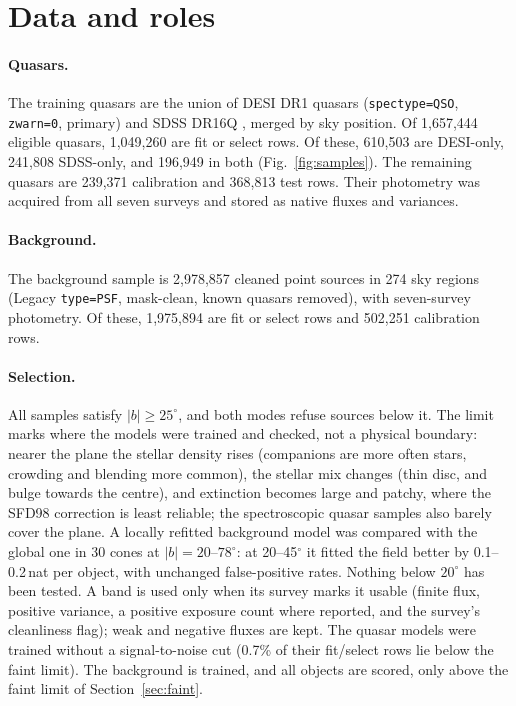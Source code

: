 \documentclass[11pt,a4paper]{article}
\newcommand{\code}[1]{\texttt{#1}}
\begin{document}
\section{Data and roles}\label{sec:data}
\paragraph{Quasars.} The training quasars are the union of DESI DR1 quasars (\code{spectype=QSO},
\code{zwarn=0}, primary) and SDSS DR16Q \citep{Lyke2020}, merged by sky position. Of 1,657,444
eligible quasars, 1,049,260 are fit or select rows. Of these, 610,503 are DESI-only, 241,808
SDSS-only, and 196,949 in both (Fig.~\ref{fig:samples}). The remaining quasars are 239,371
calibration and 368,813 test rows. Their photometry was acquired from all seven surveys and stored
as native fluxes and variances.

\paragraph{Background.} The background sample is 2,978,857 cleaned point sources in 274 sky regions
(Legacy \code{type=PSF}, mask-clean, known quasars removed), with seven-survey photometry. Of these,
1,975,894 are fit or select rows and 502,251 calibration rows.

\paragraph{Selection.} All samples satisfy $|b|\geq25^\circ$, and both modes refuse sources below it. The limit
marks where the models were trained and checked, not a physical boundary: nearer the plane the stellar density
rises (companions are more often stars, crowding and blending more common), the stellar mix changes (thin disc,
and bulge towards the centre), and extinction becomes large and patchy, where the SFD98 correction is least
reliable; the spectroscopic quasar samples also barely cover the plane. A locally refitted background model
was compared with the global one in 30 cones at $|b|=20$--$78^\circ$: at 20--45$^\circ$ it fitted the field better by
0.1--0.2\,nat per object, with unchanged false-positive rates. Nothing below $20^\circ$ has been tested. A band is used only when its survey marks
it usable (finite flux, positive variance, a positive exposure count where reported, and the survey's
cleanliness flag); weak and negative fluxes are kept. The quasar models were trained without a
signal-to-noise cut (0.7\% of their fit/select rows lie below the faint limit). The background is
trained, and all objects are scored, only above the faint limit of Section~\ref{sec:faint}.
\end{document}
